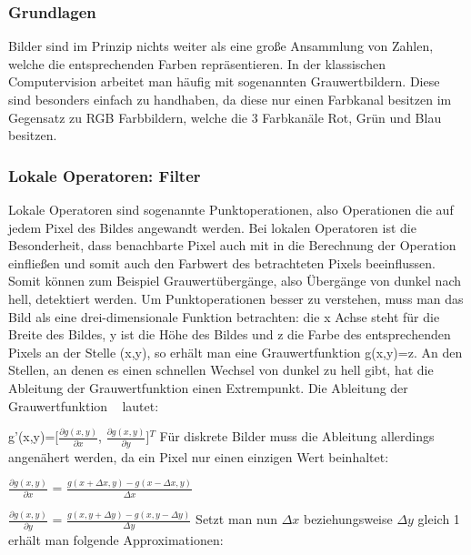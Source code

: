 \documentclass[12pt, a4paper]{article}
\begin{document}
\subsubsection{Grundlagen}
Bilder sind im Prinzip nichts weiter als eine große Ansammlung von Zahlen, welche die entsprechenden Farben repräsentieren. In der klassischen Computervision arbeitet man häufig mit sogenannten Grauwertbildern. Diese sind besonders einfach zu handhaben, da diese nur einen Farbkanal besitzen im Gegensatz zu RGB Farbbildern, welche die 3 Farbkanäle Rot, Grün und Blau besitzen.

\subsubsection{Lokale Operatoren: Filter}
Lokale Operatoren sind sogenannte Punktoperationen, also Operationen die auf jedem Pixel des Bildes angewandt werden. Bei lokalen Operatoren ist die Besonderheit, dass benachbarte Pixel auch mit in die Berechnung der Operation einfließen und somit auch den Farbwert des betrachteten Pixels beeinflussen. Somit können zum Beispiel Grauwertübergänge, also Übergänge von dunkel nach hell, detektiert werden. Um Punktoperationen besser zu verstehen, muss man das Bild als eine drei-dimensionale Funktion betrachten: die x Achse steht für die Breite des Bildes, y ist die Höhe des Bildes und z die Farbe des entsprechenden Pixels an der Stelle (x,y), so erhält man eine Grauwertfunktion g(x,y)=z. An den Stellen, an denen es einen schnellen Wechsel von dunkel zu hell gibt, hat die Ableitung der Grauwertfunktion einen Extrempunkt. Die Ableitung der Grauwertfunktion ~\cite{b5} lautet:
\newline

g'(x,y)=[$\frac{\partial g(x,y)}{\partial x}$, $\frac{\partial g(x,y)}{\partial y}$]$^T$
\newline
\newline
Für diskrete Bilder muss die Ableitung allerdings angenähert werden, da ein Pixel nur einen einzigen Wert beinhaltet:
\newline

$\frac{\partial g(x,y)}{\partial x}$ = $\frac{g(x+\Delta x,y)-g(x-\Delta x,y)}{\Delta x}$
\newline

$\frac{\partial g(x,y)}{\partial y}$ = $\frac{g(x,y+\Delta y)-g(x,y-\Delta y)}{\Delta y}$
\newline
\newline
Setzt man nun $\Delta x$ beziehungsweise $\Delta y$ gleich 1 erhält man folgende Approximationen:
\newline
\end{document}
